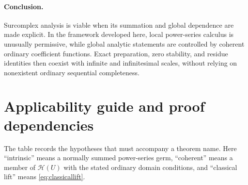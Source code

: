 \documentclass[11pt,letterpaper]{article}
\numberwithin{equation}{section}
\theoremstyle{definition}
\theoremstyle{remark}
\newcommand{\HH}{\mathscr H}
\begin{document}
\paragraph{Conclusion.}
Surcomplex analysis is viable when its summation and global dependence
are made explicit. In the framework developed here, local power-series
calculus is unusually permissive, while global analytic statements
are controlled by coherent ordinary coefficient functions. Exact
preparation, zero stability, and residue identities then coexist with
infinite and infinitesimal scales, without relying on nonexistent
ordinary sequential completeness.

\appendix
\section{Applicability guide and proof dependencies}
\label{app:guide}

The table records the hypotheses that must accompany a theorem name.
Here ``intrinsic'' means a normally summed power-series germ, ``coherent''
means a member of $\HH(U)$ with the stated ordinary domain conditions,
and ``classical lift'' means \eqref{eq:classicallift}.
\end{document}
